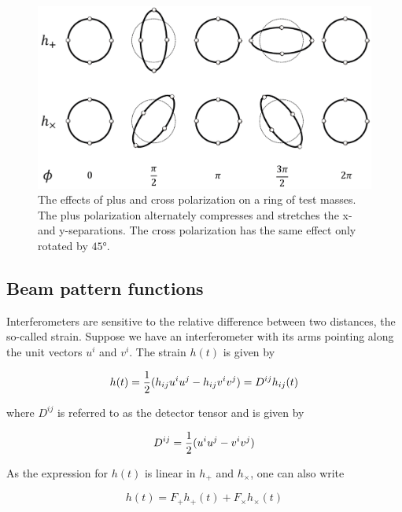 \documentclass[binding=0.6cm, LaM]{sapthesis}
\begin{document}
		\begin{figure}
		\includegraphics[scale=1]{ring}
		\centering
		\caption{The effects of plus and cross polarization on a ring of test masses. 
			 The plus polarization alternately compresses and stretches the x- and y-separations.
			 The cross polarization has the same effect only rotated by  $\ang{45}$.}
		\label{fig:ring}
		\end{figure}

\subsection{Beam pattern functions}

        Interferometers are sensitive to the relative difference between two distances, the so-called strain.
        Suppose we have an interferometer with its arms pointing along the unit vectors $u^i$ and $v^i$. The strain $h(t)$ is given by

                \begin{equation}
                h(t) = {1 \over 2} (h_{ij}u^iu^j - h_{ij}v^iv^j) = D^{ij}h_{ij}(t)
                \end{equation}

        where $D^{ij}$ is referred to as the detector tensor and is given by

                \begin{equation}
                D^{ij} = {1\over 2} (u^iu^j -v^iv^j)
                \end{equation}

        As the expression for $h(t)$ is linear in $h_{+}$ and $h_{\times}$, one can also write

                \begin{equation}
                h(t) = F_{+}h_{+} (t) + F_{\times}h_{\times}(t)
                \end{equation}
\end{document}
